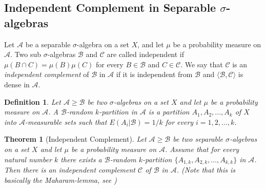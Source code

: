 \documentclass [11pt] {article}
\newtheorem{theorem}{Theorem}
\newtheorem{definition}{Definition}[section]
\begin{document}
\subsection{Independent Complement in Separable $\sigma$-algebras}


Let $\mathcal{A}$ be a separable $\sigma$-algebra on a set $X$, and
let $\mu$ be a probability measure on $\mathcal{A}$. Two sub
$\sigma$-algebras $\mathcal{B}$ and $\mathcal{C}$ are called
independent if $\mu(B\cap C)=\mu(B)\mu(C)$ for every
$B\in\mathcal{B}$ and $C\in \mathcal{C}$. We say that $\mathcal{C}$
is an {\it independent complement} of $\mathcal{B}$ in $\mathcal{A}$
if it is independent from $\mathcal{B}$ and
$\langle\mathcal{B},\mathcal{C}\rangle$ is dense in $\mathcal{A}$.

\begin{definition} Let $\mathcal{A}\geq\mathcal{B}$ be two
  $\sigma$-algebras on a set $X$ and let $\mu$ be a probability measure on
  $\mathcal{A}$.
 A $\mathcal{B}$-random $k$-partition in $\mathcal{A}$ is
  a partition $A_1,A_2,\dots,A_k$ of $X$ into $\mathcal{A}$-measurable sets
  such that $E(A_i|\mathcal{B})=1/k$ for every $i=1,2,\dots,k$.
\end{definition}

\begin{theorem}[Independent Complement]\label{incom}
 Let $\mathcal{A}\geq\mathcal{B}$ be two separable $\sigma$-algebras on a set
  $X$ and let $\mu$ be a probability measure on $\mathcal{A}$. Assume that for
  every natural number $k$ there exists a $\mathcal{B}$-random $k$-partition
  $\{A_{1,k},A_{2,k},\dots,A_{k,k}\}$ in $\mathcal{A}$. Then there is
  an independent complement $\mathcal{C}$ of $\mathcal{B}$ in $\mathcal{A}$.
 (Note that this is basically the Maharam-lemma, see \cite{Mah})
\end{theorem}
\end{document}
